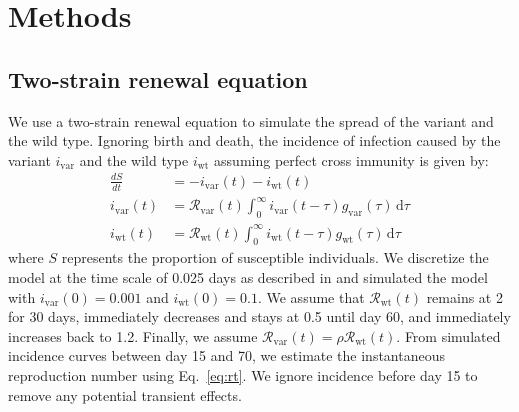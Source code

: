 \documentclass[12pt]{article}
\newcommand{\eref}[1]{Eq.~\ref{eq:#1}}
\newcommand{\vvvar}{\mathrm{var}}
\newcommand{\wwwt}{\mathrm{wt}}
\newcommand{\Rx}[1]{\ensuremath{{\mathcal R}_{#1}}\xspace}
\newcommand{\Rw}{\Rx{\wwwt}}
\newcommand{\Rv}{\Rx{\vvvar}}
\newcommand{\dd}[1]{\ensuremath{\, \mathrm{d}#1}}
\newcommand{\dtau}{\dd{\tau}}
\newcommand{\ix}[1]{\ensuremath{{i}_{#1}}\xspace}
\newcommand{\iw}{\ix{\wwwt}}
\newcommand{\iv}{\ix{\vvvar}}
\begin{document}
\section{Methods}

\subsection{Two-strain renewal equation}

We use a two-strain renewal equation to simulate the spread of the variant and the wild type.
Ignoring birth and death, the incidence of infection caused by the variant $\iv$ and the wild type $\iw$ assuming perfect cross immunity is given by:
\begin{align}
\frac{dS}{dt} &= - \iv(t) - \iw(t)\\
\iv(t) &= \Rv(t) \int_{0}^\infty \iv(t-\tau) g_{\mathrm{var}}(\tau) \dtau\\
\iw(t) &= \Rw(t) \int_{0}^\infty \iw(t-\tau) g_{\mathrm{wt}}(\tau) \dtau
\end{align}
where $S$ represents the proportion of susceptible individuals.
We discretize the model at the time scale of 0.025 days as described in \citep{park2021forward} and simulated the model with $\iv(0) = 0.001$ and $\iw(0) = 0.1$.
We assume that $\Rw(t)$ remains at 2 for 30 days, immediately decreases and stays at 0.5 until day 60, and immediately increases back to 1.2.
Finally, we assume $\Rv(t) = \rho \Rw(t)$.
From simulated incidence curves between day 15 and 70, we estimate the instantaneous reproduction number using \eref{rt}.
We ignore incidence before day 15 to remove any potential transient effects.


\end{document}
